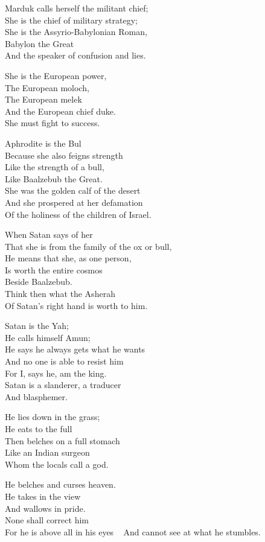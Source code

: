 \documentclass[
]{book}
\begin{document}
Marduk calls herself the militant chief;\\
She is the chief of military strategy;\\
She is the Assyrio-Babylonian Roman,\\
Babylon the Great\\
And the speaker of confusion and lies.

She is the European power,\\
The European moloch,\\
The European melek\\
And the European chief duke.\\
She must fight to success.

Aphrodite is the Bul\\
Because she also feigns strength\\
Like the strength of a bull,\\
Like Baalzebub the Great.\\
She was the golden calf of the desert\\
And she prospered at her defamation\\
Of the holiness of the children of Israel.

When Satan says of her\\
That she is from the family of the ox or bull,\\
He means that she, as one person,\\
Is worth the entire cosmos\\
Beside Baalzebub.\\
Think then what the Asherah\\
Of Satan's right hand is worth to him.

Satan is the Yah;\\
He calls himself Amun;\\
He says he always gets what he wants\\
And no one is able to resist him\\
For I, says he, am the king.\\
Satan is a slanderer, a traducer\\
And blasphemer.

He lies down in the grass;\\
He eats to the full\\
Then belches on a full stomach\\
Like an Indian surgeon\\
Whom the locals call a god.

He belches and curses heaven.\\
He takes in the view\\
And wallows in pride.\\
None shall correct him\\
For he is above all in his eyes ~
And cannot see at what he stumbles.
\end{document}
